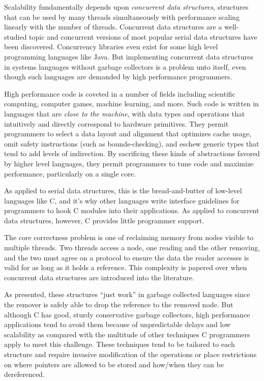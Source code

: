 Scalability fundamentally depends upon \textit{concurrent data structures}, structures that can be used by many threads simultaneously with performance scaling linearly with the number of threads.  Concurrent data structures are a well-studied topic and concurrent versions of most popular serial data structures have been discovered\cite{HSBook}.  Concurrency libraries even exist for some high level programming languages like Java.\cite{JavaUtilConcurrent}  But implementing concurrent data structures in systems languages without garbage collectors is a problem unto itself, even though such languages are demanded by high performance programmers.

High performance code is coveted in a number of fields including scientific computing, computer games, machine learning, and more.  Such code is written in languages that are \textit{close to the machine}, with data types and operations that intuitively and directly correspond to hardware primitives.\cite{Ritchie}  They permit programmers to select a data layout and alignment that optimizes cache usage, omit safety instructions (such as bounds-checking), and eschew generic types that tend to add levels of indirection.  By sacrificing these kinds of abstractions favored by higher level languages, they permit programmers to tune code and maximize performance, particularly on a single core.

As applied to serial data structures, this is the bread-and-butter of low-level languages like C, and it's why other languages write interface guidelines for programmers to hook C modules into their applications.  As applied to concurrent data structures, however, C provides little programmer support.

The core correctness problem is one of reclaiming memory from nodes visible to multiple threads.  Two threads access a node, one reading and the other removing, and the two must agree on a protocol to ensure the data the reader accesses is valid for as long as it holds a reference.  This complexity is papered over when concurrent data structures are introduced into the literature.\cite{ShavitLotanQueue, LindenPriority, HashTables, Harris}

As presented, these structures ``just work'' in garbage collected languages since the remover is safely able to drop the reference to the removed node.  But although C has good, sturdy conservative garbage collectors,\cite{BDW, DotNetGC} high performance applications tend to avoid them because of unpredictable delays and low scalability as compared with the multitude of other techniques C programmers apply to meet this challenge.  These techniques tend to be tailored to each structure and require invasive modification of the operations or place restrictions on where pointers are allowed to be stored and how/when they can be dereferenced.\cite{HP, DTA, StackTrack, Threadscan, RCU, RLU}

